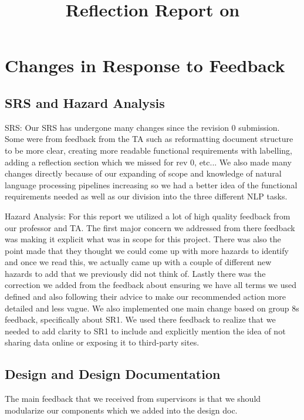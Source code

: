 \documentclass{article}
\title{Reflection Report on \progname}
\author{\authname}
\date{}
\begin{document}
\maketitle

\section{Changes in Response to Feedback}

\subsection{SRS and Hazard Analysis}
   \item SRS:
   Our SRS has undergone many changes since the revision 0 submission. Some were from feedback from the TA such as reformatting document structure to be more clear, creating more readable functional requirements with labelling, adding a reflection section which we missed for rev 0, etc... We also made many changes directly because of our expanding of scope and knowledge of natural language processing pipelines increasing so we had a better idea of the functional requirements needed as well as our division into the three different NLP tasks.
   \item Hazard Analysis:
       For this report we utilized a lot of high quality feedback from our professor and TA. The first major concern we
       addressed from there feedback was making it explicit what was in scope for this project. There was also the point
       made that they thought we could come up with more hazards to identify and once we read this, we actually came up
       with a couple of different new hazards to add that we previously did not think of. Lastly there was the correction
       we added from the feedback about ensuring we have all terms we used defined and also following their advice to make
       our recommended action more detailed and less vague. We also implemented one main change based on group 8s feedback,
       specifically about SR1. We used there feedback to realize that we needed to add clarity to SR1 to include and explicitly
       mention the idea of not sharing data online or exposing it to third-party sites.

\subsection{Design and Design Documentation}
The main feedback that we received from supervisors is that we should modularize our components which we added into the design doc.
\end{document}
